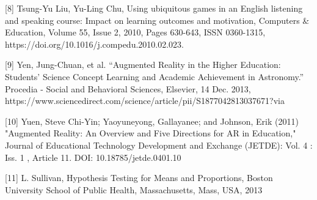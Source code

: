 \documentclass{vgtc}                          %
\begin{document}
[8] Tsung-Yu Liu, Yu-Ling Chu, Using ubiquitous games in an English listening and speaking course: Impact on learning outcomes and motivation, Computers & Education, Volume 55, Issue 2, 2010, Pages 630-643, ISSN 0360-1315, https://doi.org/10.1016/j.compedu.2010.02.023.
\vspace*{4mm}

[9] Yen, Jung-Chuan, et al. “Augmented Reality in the Higher Education: Students' Science Concept Learning and Academic Achievement in Astronomy.” Procedia - Social and Behavioral Sciences, Elsevier, 14 Dec. 2013, https://www.sciencedirect.com/science/article/pii/S1877042813037671?via%
\vspace*{4mm}

[10] Yuen, Steve Chi-Yin; Yaoyuneyong, Gallayanee; and Johnson, Erik (2011) "Augmented Reality: An Overview and Five Directions for AR in Education," Journal of Educational Technology Development and Exchange (JETDE): Vol. 4 : Iss. 1 , Article 11.
DOI: 10.18785/jetde.0401.10
\vspace*{4mm}

[11] L. Sullivan, Hypothesis Testing for Means and Proportions, Boston University School of Public Health, Massachusetts, Mass, USA, 2013
\end{document}
